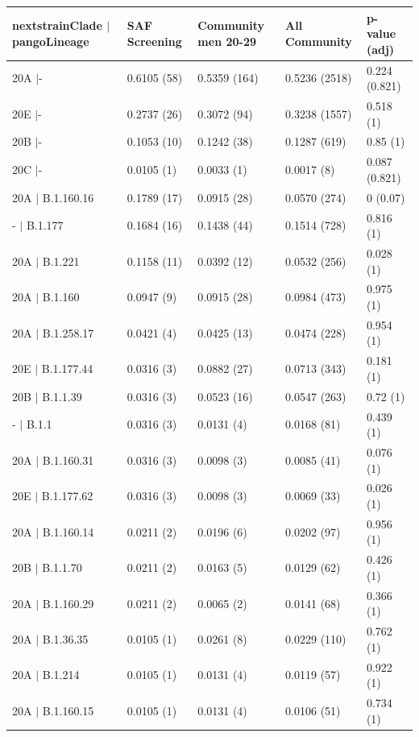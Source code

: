 \begin{table}[ht]
\centering
\begin{tabular}{lllll}
  \hline
nextstrainClade $|$ pangoLineage & SAF Screening & Community
men 20-29 & All Community & p-value (adj) \\ 
  \hline
20A $|$- & 0.6105 (58) & 0.5359 (164) & 0.5236 (2518) & 0.224 (0.821) \\ 
  20E $|$- & 0.2737 (26) & 0.3072 (94) & 0.3238 (1557) & 0.518 (1) \\ 
  20B $|$- & 0.1053 (10) & 0.1242 (38) & 0.1287 (619) & 0.85 (1) \\ 
  20C $|$- & 0.0105 (1) & 0.0033 (1) & 0.0017 (8) & 0.087 (0.821) \\ 
  20A $|$ B.1.160.16 & 0.1789 (17) & 0.0915 (28) & 0.0570 (274) & 0 (0.07) \\ 
  - $|$ B.1.177 & 0.1684 (16) & 0.1438 (44) & 0.1514 (728) & 0.816 (1) \\ 
  20A $|$ B.1.221 & 0.1158 (11) & 0.0392 (12) & 0.0532 (256) & 0.028 (1) \\ 
  20A $|$ B.1.160 & 0.0947 (9) & 0.0915 (28) & 0.0984 (473) & 0.975 (1) \\ 
  20A $|$ B.1.258.17 & 0.0421 (4) & 0.0425 (13) & 0.0474 (228) & 0.954 (1) \\ 
  20E $|$ B.1.177.44 & 0.0316 (3) & 0.0882 (27) & 0.0713 (343) & 0.181 (1) \\ 
  20B $|$ B.1.1.39 & 0.0316 (3) & 0.0523 (16) & 0.0547 (263) & 0.72 (1) \\ 
  - $|$ B.1.1 & 0.0316 (3) & 0.0131 (4) & 0.0168 (81) & 0.439 (1) \\ 
  20A $|$ B.1.160.31 & 0.0316 (3) & 0.0098 (3) & 0.0085 (41) & 0.076 (1) \\ 
  20E $|$ B.1.177.62 & 0.0316 (3) & 0.0098 (3) & 0.0069 (33) & 0.026 (1) \\ 
  20A $|$ B.1.160.14 & 0.0211 (2) & 0.0196 (6) & 0.0202 (97) & 0.956 (1) \\ 
  20B $|$ B.1.1.70 & 0.0211 (2) & 0.0163 (5) & 0.0129 (62) & 0.426 (1) \\ 
  20A $|$ B.1.160.29 & 0.0211 (2) & 0.0065 (2) & 0.0141 (68) & 0.366 (1) \\ 
  20A $|$ B.1.36.35 & 0.0105 (1) & 0.0261 (8) & 0.0229 (110) & 0.762 (1) \\ 
  20A $|$ B.1.214 & 0.0105 (1) & 0.0131 (4) & 0.0119 (57) & 0.922 (1) \\ 
  20A $|$ B.1.160.15 & 0.0105 (1) & 0.0131 (4) & 0.0106 (51) & 0.734 (1) \\ 

\end{tabular}
\end{table}
